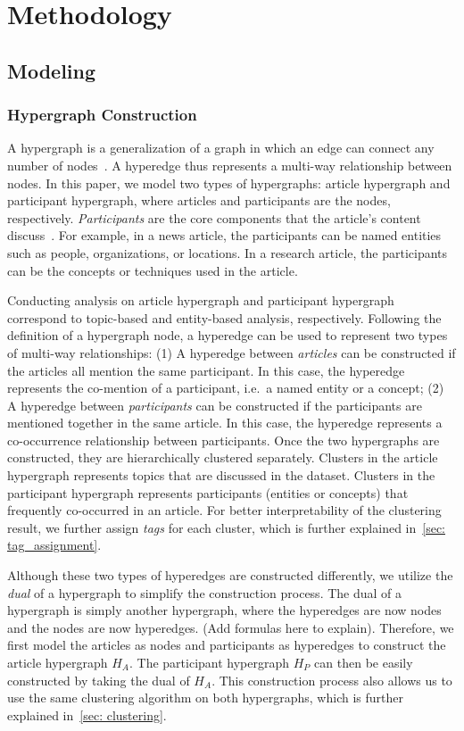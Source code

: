 \section{Methodology}
\subsection{Modeling}
\subsubsection{Hypergraph Construction}
A hypergraph is a generalization of a graph in which an edge can connect any number of nodes~\cite{fischer2021hypergraphsurvey}.
A hyperedge thus represents a multi-way relationship between nodes.
In this paper, we model two types of hypergraphs: article hypergraph and participant hypergraph, where articles and participants are the nodes, respectively.
\textit{Participants} are the core components that the article's content discuss~\cite{use_other_works_to_refine_definition}.
For example, in a news article, the participants can be named entities such as people, organizations, or locations.
In a research article, the participants can be the concepts or techniques used in the article.

Conducting analysis on article hypergraph and participant hypergraph correspond to topic-based and entity-based analysis, respectively.
Following the definition of a hypergraph node, a hyperedge can be used to represent two types of multi-way relationships:
(1) A hyperedge between \textit{articles} can be constructed if the articles all mention the same participant. 
In this case, the hyperedge represents the co-mention of a participant, i.e.\ a named entity or a concept;
(2) A hyperedge between \textit{participants} can be constructed if the participants are mentioned together in the same article.
In this case, the hyperedge represents a co-occurrence relationship between participants.
Once the two hypergraphs are constructed, they are hierarchically clustered separately.
Clusters in the article hypergraph represents topics that are discussed in the dataset.
Clusters in the participant hypergraph represents participants (entities or concepts) that frequently co-occurred in an article.
For better interpretability of the clustering result, we further assign \textit{tags} for each cluster, which is further explained in~\autoref{sec: tag_assignment}.

Although these two types of hyperedges are constructed differently, we utilize the \textit{dual} of a hypergraph to simplify the construction process.
The dual of a hypergraph is simply another hypergraph, where the hyperedges are now nodes and the nodes are now hyperedges. (Add formulas here to explain).
Therefore, we first model the articles as nodes and participants as hyperedges to construct the article hypergraph $H_A$.
The participant hypergraph $H_P$ can then be easily constructed by taking the dual of $H_A$.
This construction process also allows us to use the same clustering algorithm on both hypergraphs, which is further explained in~\autoref{sec: clustering}.

